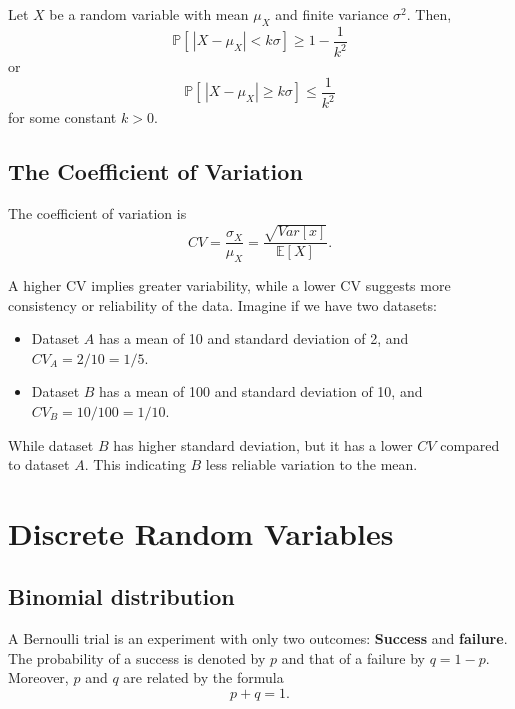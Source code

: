 \begin{theorem}
    Let $X$ be a random variable with mean $\mu_X$ and finite variance $\sigma^2$. 
    Then,
    \begin{equation}
        \mathbb{P}[\,|X - \mu_X| < k\sigma] \geq 1 - \frac{1}{k^2}
    \end{equation}
    or 
    \begin{equation}
        \mathbb{P}[\,|X - \mu_X| \geq k\sigma] \leq \frac{1}{k^2} 
    \end{equation}
    for some constant $k > 0$.
\end{theorem}

\subsection{The Coefficient of Variation}
\begin{definition}
    The coefficient of variation is 
    \begin{equation}
        CV = \frac{\sigma_X}{\mu_X} = \frac{\sqrt{Var[x]}}{\mathbb{E}[X]}.
    \end{equation}
\end{definition}

A higher CV implies greater variability, while a lower CV suggests more consistency or reliability of 
the data. Imagine if we have two datasets:
\begin{itemize}
    \item Dataset $A$ has a mean of 10 and standard deviation of 2, and $CV_A = 2/10 = 1/5$.
    \item Dataset $B$ has a mean of 100 and standard deviation of 10, and $CV_B = 10/100 = 1/10$.
\end{itemize}
While dataset $B$ has higher standard deviation, but it has a lower $CV$ compared to dataset $A$. This indicating
$B$ less reliable variation to the mean.

\section{Discrete Random Variables}

\subsection{Binomial distribution}

A Bernoulli trial is an experiment with only two outcomes: \textbf{Success} and \textbf{failure}. 
The probability of a success is denoted by $p$ and that of a failure by $q=1-p$. Moreover, 
$p$ and $q$ are related by the formula
\[
    p + q = 1.
\]

